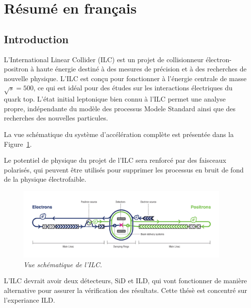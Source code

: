 \section{R\'esum\'e en fran\c cais}

\renewcommand{\sm}{Modèle standard}
\subsection*{Introduction}


L'International Linear Collider \cite{bib:ILC} (ILC) est un projet de collisionneur électron-positron à haute énergie destiné à des mesures de précision et à des recherches de nouvelle physique.
L'ILC est conçu pour fonctionner à l'énergie centrale de masse $\sqrt{s} = 500$\gev, ce qui est idéal pour des études sur les interactions électriques du quark top.
L'état initial leptonique bien connu à l'ILC permet une analyse propre, indépendante du modèle des processus Modele Standard ainsi que des recherches des nouvelles particules.


La vue schématique du système d'accélération complète est présentée dans la Figure~\ref {fig:ILCSchemeF}.

Le potentiel de physique du projet de l'ILC sera renforcé par des faisceaux polarisés, qui peuvent être utilisés pour supprimer les processus en bruit de fond de la physique électrofaible.

\begin{figure}
	{\centering
		\includegraphics[width=0.95\textwidth]{graphics/ILC_scheme.jpg}
		\caption{\sl Vue sch\'ematique de l'ILC.}
		\label{fig:ILCSchemeF}
	}
\end{figure}

L’ILC devrait avoir deux d\'etecteurs, SiD et ILD, qui vont fonctionner de mani\`ere alternative pour assurer la v\'erification des r\'esultats.
Cette th\'es\`e est concentr\'e sur l'experiance ILD. 

